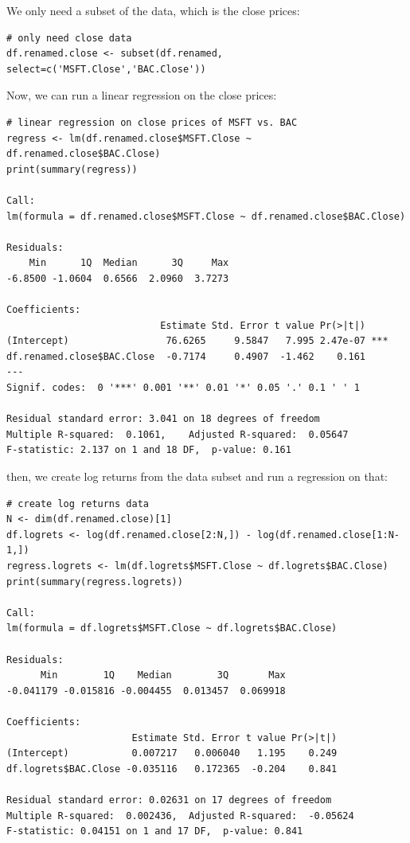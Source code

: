 \documentclass[paper=a4, fontsize=11pt]{scrartcl} %
\numberwithin{equation}{section} %
\numberwithin{figure}{section} %
\numberwithin{table}{section} %
\begin{document}
We only need a subset of the data, which is the close prices:

\begin{verbatim}
# only need close data
df.renamed.close <- subset(df.renamed, select=c('MSFT.Close','BAC.Close'))
\end{verbatim}

Now, we can run a linear regression on the close prices:

\begin{verbatim}
# linear regression on close prices of MSFT vs. BAC
regress <- lm(df.renamed.close$MSFT.Close ~ df.renamed.close$BAC.Close)
print(summary(regress))

Call:
lm(formula = df.renamed.close$MSFT.Close ~ df.renamed.close$BAC.Close)

Residuals:
    Min      1Q  Median      3Q     Max 
-6.8500 -1.0604  0.6566  2.0960  3.7273 

Coefficients:
                           Estimate Std. Error t value Pr(>|t|)    
(Intercept)                 76.6265     9.5847   7.995 2.47e-07 ***
df.renamed.close$BAC.Close  -0.7174     0.4907  -1.462    0.161    
---
Signif. codes:  0 '***' 0.001 '**' 0.01 '*' 0.05 '.' 0.1 ' ' 1

Residual standard error: 3.041 on 18 degrees of freedom
Multiple R-squared:  0.1061,	Adjusted R-squared:  0.05647 
F-statistic: 2.137 on 1 and 18 DF,  p-value: 0.161
\end{verbatim}

then, we create log returns from the data subset and run a regression on that:

\begin{verbatim}
# create log returns data
N <- dim(df.renamed.close)[1]
df.logrets <- log(df.renamed.close[2:N,]) - log(df.renamed.close[1:N-1,])
regress.logrets <- lm(df.logrets$MSFT.Close ~ df.logrets$BAC.Close)
print(summary(regress.logrets))

Call:
lm(formula = df.logrets$MSFT.Close ~ df.logrets$BAC.Close)

Residuals:
      Min        1Q    Median        3Q       Max 
-0.041179 -0.015816 -0.004455  0.013457  0.069918 

Coefficients:
                      Estimate Std. Error t value Pr(>|t|)
(Intercept)           0.007217   0.006040   1.195    0.249
df.logrets$BAC.Close -0.035116   0.172365  -0.204    0.841

Residual standard error: 0.02631 on 17 degrees of freedom
Multiple R-squared:  0.002436,	Adjusted R-squared:  -0.05624 
F-statistic: 0.04151 on 1 and 17 DF,  p-value: 0.841
\end{verbatim}
\end{document}
